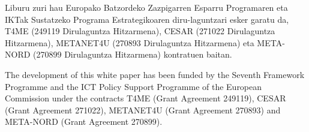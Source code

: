 \documentclass[10pt]{article}
\begin{document}
\begin{small}
 Liburu zuri hau Europako Batzordeko Zazpigarren Esparru Programaren eta 
 IKTak Sustatzeko Programa Estrategikoaren diru-laguntzari esker garatu da, 
 T4ME (249119 Dirulaguntza Hitzarmena), CESAR (271022 Dirulaguntza Hitzarmena), 
 METANET4U (270893 Dirulaguntza Hitzarmena) eta META-NORD 
 (270899 Dirulaguntza Hitzarmena) kontratuen baitan.
\end{small}

\bigskip
\begin{small}
  The development of this white paper has been funded by the Seventh
  Framework Programme and the ICT Policy Support Programme of the
  European Commission under the contracts T4ME (Grant Agreement 249119),
  CESAR (Grant Agreement 271022), METANET4U (Grant Agreement 270893)
  and META-NORD (Grant Agreement 270899).
\end{small}

\clearpage
\end{document}
